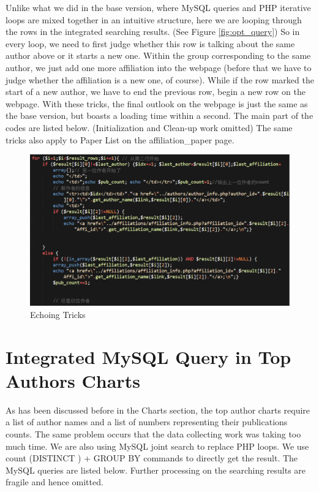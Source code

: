 \documentclass{book}
\begin{document}
Unlike what we did in the base version, where MySQL queries and PHP iterative loops are mixed together in an intuitive structure, here we are looping through the rows in the integrated searching results. (See Figure \ref{fig:opt_query}) So in every loop, we need to first judge whether this row is talking about the same author above or it starts a new one. Within the group corresponding to the same author, we just add one more affiliation into the webpage (before that we have to judge whether the affiliation is a new one, of course). While if the row marked the start of a new author, we have to end the previous row, begin a new row on the webpage. With these tricks, the final outlook on the webpage is just the same as the base version, but boasts a loading time within a second. The main part of the codes are listed below. (Initialization and Clean-up work omitted) The same tricks also apply to Paper List on the affiliation\_paper page. 


\begin{figure}[H]
\centering{}
\includegraphics[scale=0.45]{img/zlt_opt_code_advanced.png}
\caption{Echoing Tricks}
\end{figure}

\section{Integrated MySQL Query in Top Authors Charts}

As has been discussed before in the Charts section, the top author charts require a list of author names and a list of numbers representing their publications counts. The same problem occurs that the data collecting work was taking too much time. We are also using MySQL joint search to replace PHP loops. We use count (DISTINCT ) + GROUP BY commands to directly get the result. The MySQL queries are listed below. Further processing on the searching results are fragile and hence omitted. 
\end{document}
